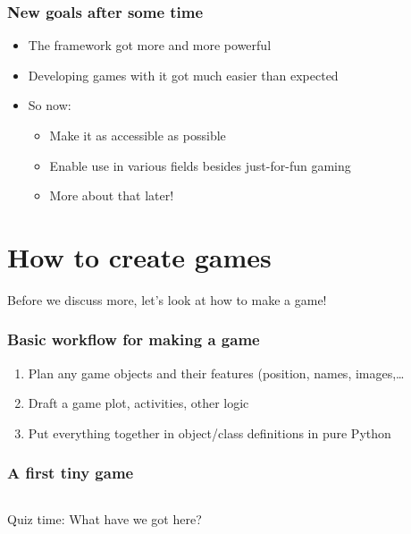 \documentclass[aspectratio=43]{beamer}
\begin{document}
 \begin{frame}
  \frametitle{New goals after some time}

  \begin{itemize}
   \item{The framework got more and more powerful}
   \item{Developing games with it got much easier than expected}
   \item{So now:
    \begin{itemize}
     \item{Make it as accessible as possible}
     \item{Enable use in various fields besides just-for-fun gaming}
     \item{More about that later!}
    \end{itemize}
   }
  \end{itemize}
 \end{frame}

 \section{How to create games}

 \begin{frame}
  \Large
  Before we discuss more, let's look at how to make a game!
 \end{frame}

 \begin{frame}
  \frametitle{Basic workflow for making a game}

  \begin{enumerate}
   \item{Plan any game objects and their features (position, names, images,…}
   \item{Draft a game plot, activities, other logic}
   \item{Put everything together in object/class definitions in pure Python}
  \end{enumerate}
 \end{frame}

 \begin{frame}
  \frametitle{A first tiny game}

  {
   \inputminted[linenos,breaklines]{python}{ex_schoolkid.py}
  }
 \end{frame}

 \begin{frame}
  \Large
  Quiz time: What have we got here?
 \end{frame}
\end{document}
